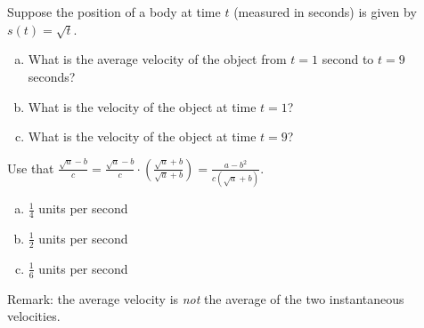 \begin{Mquestion}
Suppose the position of a body at time $t$ (measured in seconds) is given by
$s(t)=\sqrt{t}$.
\begin{enumerate}[(a)]
\item What is the average velocity of the object from $t=1$ second to $t=9$ seconds?
\item What is the velocity of the object at time $t=1$?
\item What is the velocity of the object at time $t=9$?
\end{enumerate}
\end{Mquestion}
\begin{hint}
Use that $\frac{\sqrt{a}-b}{c}
                  = \frac{\sqrt{a}-b}{c}\cdot
                            \left(\frac{\sqrt{a}+b}{\sqrt{a}+b}\right)
                  = \frac{a-b^2}{c(\sqrt{a}+b)}$.
 \end{hint}
\begin{answer}
\begin{enumerate}[(a)]
\item $\frac{1}{4}$ units per second
\item $\frac{1}{2}$ units per second
\item $\frac{1}{6}$ units per second
\end{enumerate}
Remark: the average velocity is \emph{not} the average of the two instantaneous velocities.
\end{answer}
